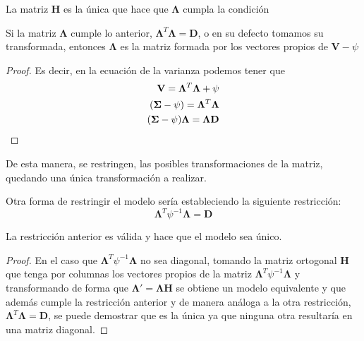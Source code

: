 \begin{coro}
La matriz $\textbf{H}$ es la única que hace que $\mathbf{\Lambda}$ cumpla la condición 
\end{coro}

\begin{propo}
Si la matriz $\mathbf{\Lambda}$ cumple lo anterior, $\mathbf{\Lambda}^T \mathbf{\Lambda}=\textbf{D}$, o en su defecto tomamos su transformada, entonces $\mathbf{\Lambda}$ es la matriz formada por los vectores propios de $\textbf{V}-\psi$
\begin{proof}
Es decir, en la ecuación de la varianza podemos tener que 
\begin{equation}
\begin{split}
\textbf{V}=\mathbf{\Lambda}^T\mathbf{\Lambda}+\psi\\
(\mathbf{\Sigma}-\psi)=\mathbf{\Lambda}^T\mathbf{\Lambda}\\
(\mathbf{\Sigma}-\psi)\mathbf{\Lambda}=\mathbf{\Lambda}\textbf{D}\qedhere
\end{split}
\end{equation}
\end{proof}
\end{propo}

\noindent De esta manera, se restringen, las posibles transformaciones de la matriz, quedando una única transformación a realizar.

\noindent Otra forma de restringir el modelo sería estableciendo la siguiente restricción:
\begin{equation}
\mathbf{\Lambda}^T \psi^{-1}\mathbf{\Lambda}=\textbf{D}
\end{equation}

\begin{propo}
La restricción anterior es válida y hace que el modelo sea único. 
\begin{proof}
En el caso que $\mathbf{\Lambda}^T \psi^{-1}\mathbf{\Lambda}$ no sea diagonal, tomando la matriz ortogonal $\textbf{H}$ que tenga por columnas los vectores propios de la matriz $\mathbf{\Lambda}^T \psi^{-1}\mathbf{\Lambda}$ y transformando de forma que $\mathbf{\Lambda}'=\mathbf{\Lambda}\textbf{H}$  se obtiene un modelo equivalente y que además cumple la restricción anterior y de manera análoga a la otra restricción, $\mathbf{\Lambda}^T\mathbf{\Lambda}=\textbf{D}$, se puede demostrar que es la única ya que ninguna otra resultaría en una matriz diagonal. 
\end{proof}
\end{propo}

